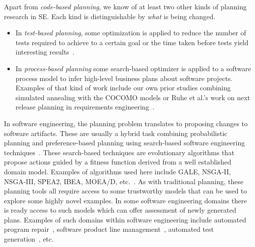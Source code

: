 \documentclass[smallextended]{svjour3}       %
\newcommand{\bi}{\begin{itemize}} %
\newcommand{\ei}{\end{itemize}}
\begin{document}
Apart from {\em code-based planning}, we know of at least two other kinds of planning research in SE. Each kind is distinguishable by {\em what} is being changed.
\bi
\item
In {\em test-based planning}, some optimization is applied to reduce the number of tests required to achieve to a certain goal or the time taken before tests yield interesting results~\cite{tallam2006concept, yoo2012regression, blue2013interaction}.
\item
In {\em process-based planning} some search-based optimizer is applied to a software process model to infer high-level business plans about software projects. Examples of that kind of work include our own prior studies combining simulated annealing with the COCOMO models or Ruhe et al.'s work on next release planning in requirements engineering~\cite{ruhe2003quantitative, ruhe2010product}. 
\ei
In software engineering, the planning problem translates to proposing changes to software artifacts. These are usually a hybrid task combining probabilistic planning and preference-based planning using search-based software engineering techniques~\cite{Harman2009, Harman2011}. These search-based techniques are evolutionary algorithms that propose actions guided by a fitness function derived from a well established domain model. Examples of algorithms used here include GALE, NSGA-II, NSGA-III, SPEA2, IBEA, MOEA/D, etc.~\cite{krall2015gale, deb00a, zit02, zit04, deb14, Cui2005a, zhang07:TEC}. 
As with traditional planning, these planning tools all require access to some trustworthy models that can be used to explore some highly novel examples. In some software engineering domains there is ready access to such models which can offer assessment of newly generated plans. Examples of such domains within software engineering include automated program repair~\cite{Weimer2009, Goues12, LeGoues2015}, software product line management~\cite{sayyad13, metzger14, henard15}, automated test generation~\cite{andrews07, andrews10}, etc. 
\end{document}
